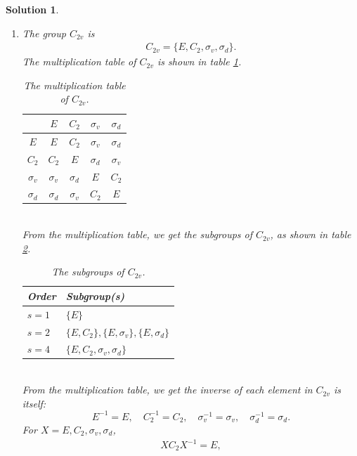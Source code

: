 \documentclass[UTF8,10pt,a4paper]{article}
\theoremstyle{Problem}
\theoremstyle{Solution}
\newtheorem*{sol}{Solution}
\begin{document}
\begin{sol}
    \begin{enumerate}
        \item[(a)] The group $C_{2v}$ is
        \begin{align}
            C_{2v}=\{E,C_2,\sigma_v,\sigma_d\}.
        \end{align}
        The multiplication table of $C_{2v}$ is shown in table \ref{5-C2v-MT}.
        \begin{table}[]
            \centering
            \caption{The multiplication table of $C_{2v}$.}
            \label{5-C2v-MT}
            \begin{tabular}{c|cccc}
             & $E$ & $C_2$ & $\sigma_v$ & $\sigma_d$ \\ \hline
            $E$ & $E$ & $C_2$ & $\sigma_v$ & $\sigma_d$ \\
            $C_2$ & $C_2$ & $E$ & $\sigma_d$ & $\sigma_v$ \\
            $\sigma_v$ & $\sigma_v$ & $\sigma_d$ & $E$ & $C_2$ \\
            $\sigma_d$ & $\sigma_d$ & $\sigma_v$ & $C_2$ & $E$
            \end{tabular}
        \end{table}
        \\From the multiplication table, we get the subgroups of $C_{2v}$, as shown in table \ref{5-C2v-sg}.
        \begin{table}[h]
            \centering
            \caption{The subgroups of $C_{2v}$.}
            \label{5-C2v-sg}
            \begin{tabular}{ll}
            \hline
            Order & Subgroup(s) \\ \hline
            $s=1$ & $\{E\}$ \\
            $s=2$ & $\{E,C_2\},\{E,\sigma_v\},\{E,\sigma_d\}$ \\
            $s=4$ & $\{E,C_2,\sigma_v,\sigma_d\}$ \\ \hline
            \end{tabular}
        \end{table}
        \\From the multiplication table, we get the inverse of each element in $C_{2v}$ is itself:
        \[
            E^{-1}=E,\quad C_2^{-1}=C_2,\quad\sigma_v^{-1}=\sigma_v,\quad\sigma_d^{-1}=\sigma_d.
        \]
        For $X=E,C_2,\sigma_v,\sigma_d$,
        \begin{align}
            XC_2X^{-1}=E,
        \end{align}

\end{enumerate}
\end{sol}
\end{document}
